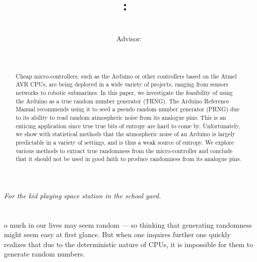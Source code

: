 \documentclass[a4paper]{article}           %
\title{
    \Class:\ \Title
    \ifthenelse{\equal{\SubTitle}{}}{}{\\{\SubTitle}}
    }
\date{\small{\DueLang\ \DueDate}}
\author{\AuthorName\\Advisor: \ClassInstructor}
\newcommand{\tmpsection}[1]{}
\let\tmpsection=\section
\renewcommand{\section}[2]{

    \ifthenelse{
      \equal{#2}{Heimildir} %
    }
    {
      \tmpsection{\sc{#1} }
      \tmpsection{\sc{#2} }
    }
    {\tmpsection{\sc{#1} } }
      

}
\begin{document}
\maketitle

\begin{center}
\textit{For the kid playing space station in the school yard. }
\end{center}



\begin{abstract}

  Cheap micro-controllers, such as the Arduino or other controllers
  based on the Atmel AVR CPUs, are being deployed in a wide variety of
  projects, ranging from sensors networks to robotic submarines. In
  this paper, we investigate the feasibility of using the Arduino as a
  true random number generator (TRNG). The Arduino Reference Manual
  recommends using it to seed a pseudo random number generator (PRNG)
  due to its ability to read random atmospheric noise from its
  analogue pins. This is an enticing application since true true bits
  of entropy are hard to come by. Unfortunately, we show with
  statistical methods that the atmospheric noise of an Arduino is
  largely predictable in a variety of settings, and is thus a weak
  source of entropy. We explore various methods to extract true
  randomness from the micro-controller and conclude that it should not
  be used in good faith to produce randomness from its analogue pins.

\end{abstract}

\section{Introduction}

So much in our lives may seem random --- so thinking that generating randomness might seem easy at first glance. But when one inquires further one quickly realizes that due to the deterministic nature of CPUs, it is impossible for them to generate random numbers. 
\end{document}
